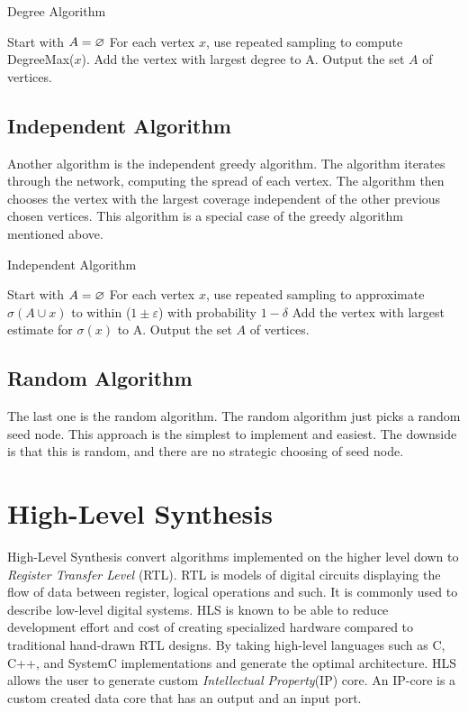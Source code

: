 \begin{algorithm}
\caption{Degree Algorithm}
\begin{algorithmic}[1]
\State Start with $A = \oldemptyset$
\State For each vertex $x$, use repeated sampling to compute DegreeMax($x$).
\State Add the vertex with largest degree to A.
\EndWhile
\State Output the set $A$ of vertices.
\end{algorithmic}
\end{algorithm}

\subsection{Independent Algorithm}
Another algorithm is the independent greedy algorithm. The algorithm iterates through the network, computing the spread of each vertex. The algorithm then chooses the vertex with the largest coverage independent of the other previous chosen vertices. This algorithm is a special case of the greedy algorithm mentioned above.

\begin{algorithm}
\caption{Independent Algorithm}
\begin{algorithmic}[1]
\State Start with $A = \oldemptyset$
\State For each vertex $x$, use repeated sampling to approximate $\sigma(A \cup {x}) $ to within ($1 \pm \varepsilon$) with probability
$1 − \delta$
\State Add the vertex with largest estimate for $\sigma({x})$ to A.
\EndWhile
\State Output the set $A$ of vertices.
\end{algorithmic}
\end{algorithm}



\subsection{Random Algorithm}
The last one is the random algorithm. The random algorithm just picks a random seed node. This approach is the simplest to implement and easiest. The downside is that this is random, and there are no strategic choosing of seed node. 

 
 
\section{High-Level Synthesis}

High-Level Synthesis convert algorithms implemented on the higher level down to \textit{Register Transfer Level} (RTL)\cite{HLSTutorial}. RTL is models of digital circuits displaying the flow of data between register, logical operations and such. It is commonly used to describe low-level digital systems. HLS is known to be able to reduce development effort and cost of creating specialized hardware compared to traditional hand-drawn RTL designs\cite{zhao2016improving}\cite{Zuo:2013:IHL:2435264.2435271}\cite{HLSTutorial}. By taking high-level languages such as C, C++, and SystemC implementations and generate the optimal architecture. HLS allows the user to generate custom \textit{Intellectual Property}(IP) core. An IP-core is a custom created data core that has an output and an input port.


